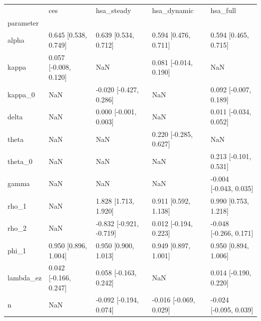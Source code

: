 \begin{tabular}{lllll}
\toprule
 & ces & hsa\_steady & hsa\_dynamic & hsa\_full \\
parameter &  &  &  &  \\
\midrule
alpha & 0.645 [0.538, 0.749] & 0.639 [0.534, 0.712] & 0.594 [0.476, 0.711] & 0.594 [0.465, 0.715] \\
kappa & 0.057 [-0.008, 0.120] & NaN & 0.081 [-0.014, 0.190] & NaN \\
kappa\_0 & NaN & -0.020 [-0.427, 0.286] & NaN & 0.092 [-0.007, 0.189] \\
delta & NaN & 0.000 [-0.001, 0.003] & NaN & 0.011 [-0.034, 0.052] \\
theta & NaN & NaN & 0.220 [-0.285, 0.627] & NaN \\
theta\_0 & NaN & NaN & NaN & 0.213 [-0.101, 0.531] \\
gamma & NaN & NaN & NaN & -0.004 [-0.043, 0.035] \\
rho\_1 & NaN & 1.828 [1.713, 1.920] & 0.911 [0.592, 1.138] & 0.990 [0.753, 1.218] \\
rho\_2 & NaN & -0.832 [-0.921, -0.719] & 0.012 [-0.194, 0.223] & -0.048 [-0.266, 0.171] \\
phi\_1 & 0.950 [0.896, 1.004] & 0.950 [0.900, 1.013] & 0.949 [0.897, 1.001] & 0.950 [0.894, 1.006] \\
lambda\_ez & 0.042 [-0.166, 0.247] & 0.058 [-0.163, 0.242] & NaN & 0.014 [-0.190, 0.220] \\
n & NaN & -0.092 [-0.194, 0.074] & -0.016 [-0.069, 0.029] & -0.024 [-0.095, 0.039] \\
\bottomrule
\end{tabular}
